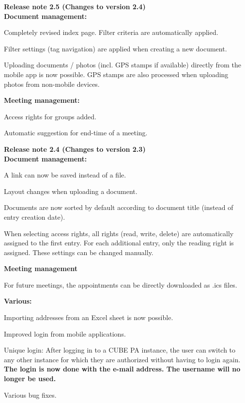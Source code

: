 \textbf{Release note 2.5 (Changes to version 2.4)} \\
\textbf{Document management:}
\begin{compactitem}
  \item Completely revised index page. Filter criteria are automatically applied.
	\item Filter settings (tag navigation) are applied when creating a new document.
	\item Uploading documents / photos (incl. GPS stamps if available) directly from the mobile app is now possible. GPS stamps are also processed when uploading photos from non-mobile devices.
\end{compactitem}
\textbf{Meeting management:}
\begin{compactitem}
  \item Access rights for groups added.
	\item Automatic suggestion for end-time of a meeting.
\end{compactitem}

\vspace{\baselineskip}

\textbf{Release note 2.4 (Changes to version 2.3)} \\

\textbf{Document management:}
\begin{compactitem}
	\item A link can now be saved instead of a file.
	\item Layout changes when uploading a document.
	\item Documents are now sorted by default according to document title (instead of entry creation date).
	\item When selecting access rights, all rights (read, write, delete) are automatically assigned to the first entry. For each additional entry, only the reading right is assigned. These settings can be changed manually.
\end{compactitem}
\textbf{Meeting management}
\begin{compactitem}
	\item For future meetings, the appointments can be directly downloaded as .ics files.
\end{compactitem}
\textbf{Various:}
\begin{compactitem}
	\item Importing addresses from an Excel sheet is now possible.
	\item Improved login from mobile applications.
	\item Unique login: After logging in to a CUBE PA instance, the user can switch to any other instance for which they are authorized without having to login again. \textbf{The login is now done with the e-mail address. The username will no longer be used.}
	\item Various bug fixes.
\end{compactitem}

